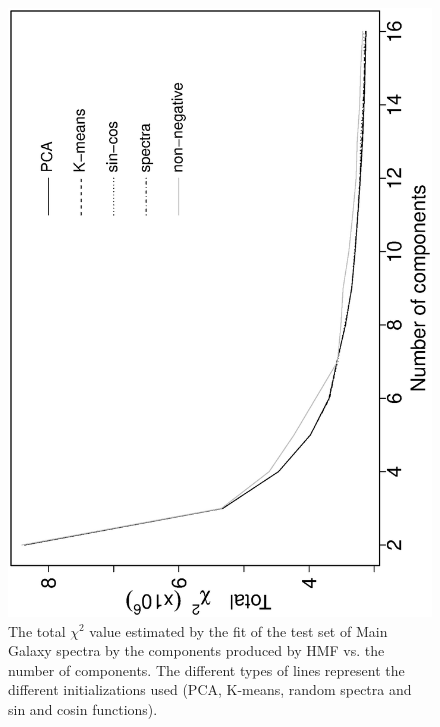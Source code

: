 \documentclass[12pt,preprint]{aastex}
\begin{document}
\clearpage
\begin{figure}
\includegraphics[angle=-90,width=0.49\columnwidth]{paper_plots/fig6}
\caption{The total $\chi^2$ value estimated by the fit of the test set
  of Main Galaxy spectra by the components produced by HMF vs. the
  number of components. The different types of lines represent the
  different initializations used (PCA, K-means, random spectra and sin
  and cosin functions).}
\label{fig:4}
\end{figure}
\end{document}
